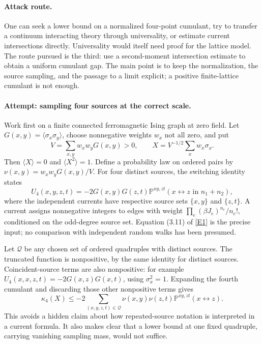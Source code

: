 \documentclass[11pt,a4paper]{article}
\numberwithin{equation}{section}
\newcommand{\eref}[2]{\hyperlink{extra:#1:#2}{[E#2]}}
\begin{document}
\paragraph{Attack route.}
One can seek a lower bound on a normalized four-point cumulant, try to
transfer a continuum interacting theory through universality, or estimate
current intersections directly. Universality would itself need proof for
the lattice model. The route pursued is the third: use a second-moment
intersection estimate to obtain a uniform cumulant gap. The main point is
to keep the normalization, the source sampling, and the passage to a limit
explicit; a positive finite-lattice cumulant is not enough.

\paragraph{Attempt: sampling four sources at the correct scale.}
Work first on a finite connected ferromagnetic Ising graph at zero field.
Let $G(x,y)=\langle\sigma_x\sigma_y\rangle$, choose nonnegative weights
$w_x$ not all zero, and put
\[
 V=\sum_{x,y}w_xw_yG(x,y)>0,
 \qquad X=V^{-1/2}\sum_xw_x\sigma_x.
\]
Then $\langle X\rangle=0$ and $\langle X^2\rangle=1$. Define a probability
law on ordered pairs by
$\nu(x,y)=w_xw_yG(x,y)/V$.
For four distinct sources, the switching identity states
\begin{equation}\label{eq73:current}
 U_4(x,y,z,t)=-2G(x,y)G(z,t)
   \mathbb P^{xy,zt}(x\leftrightarrow z\text{ in }n_1+n_2),
\end{equation}
where the independent currents have respective source sets $\{x,y\}$ and
$\{z,t\}$. A current assigns nonnegative integers to edges with weight
$\prod_e(\beta J_e)^{n_e}/n_e!$, conditioned on the odd-degree source set.
Equation (3.11) of \eref{73}{1} is the precise input; no comparison with
independent random walks has been presumed.

Let $\mathcal Q$ be any chosen set of ordered quadruples with distinct
sources. The truncated function is nonpositive, by the same identity for
distinct sources. Coincident-source terms are also nonpositive: for example
$U_4(x,x,z,t)=-2G(x,z)G(x,t)$, using $\sigma_x^2=1$.
Expanding the fourth cumulant and discarding those other nonpositive terms
gives
\begin{equation}\label{eq73:weighted}
 \kappa_4(X)\leq-2\sum_{(x,y,z,t)\in\mathcal Q}
       \nu(x,y)\nu(z,t)
       \mathbb P^{xy,zt}(x\leftrightarrow z).
\end{equation}
This avoids a hidden claim about how repeated-source notation is interpreted
in a current formula. It also makes clear that a lower bound at one fixed
quadruple, carrying vanishing sampling mass, would not suffice.
\end{document}
